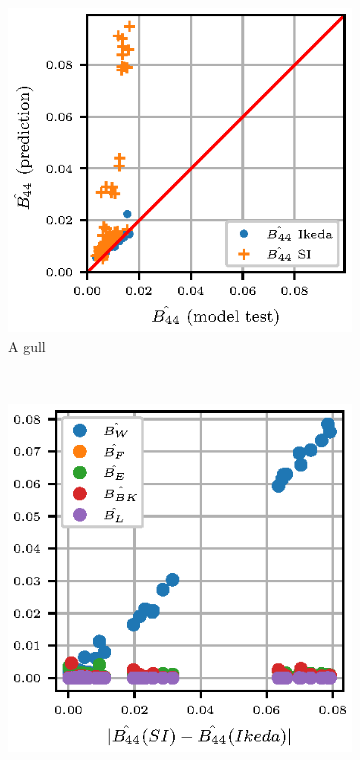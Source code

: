 \begin{figure}
    \centering
    \begin{subfigure}[b]{0.5\textwidth}
        \includegraphics[]{figures/si_ikeda_model.eps}
        \caption{A gull}
        \label{fig:gull}
    \end{subfigure}
    ~ %
    \begin{subfigure}[b]{0.5\textwidth}
        \includegraphics[]{figures/component_residual.eps}

\end{subfigure}
\end{figure}
